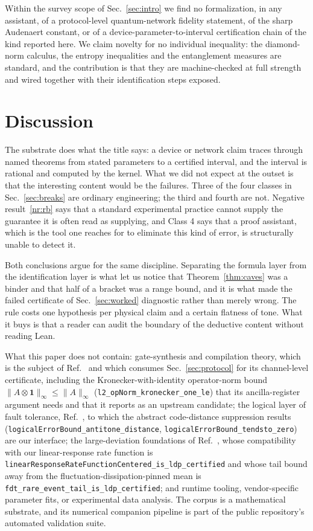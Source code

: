 \documentclass[aps,pra,reprint,nofootinbib,superscriptaddress]{revtex4-2}
\theoremstyle{plain}
\theoremstyle{definition}
\theoremstyle{remark}
\newcommand{\lean}[1]{\texttt{#1}}
\newcommand{\opnorm}[1]{\lVert #1 \rVert_{\infty}}
\begin{document}
Within the survey scope of Sec.~\ref{sec:intro} we find no formalization,
in any assistant, of a protocol-level quantum-network fidelity statement,
of the sharp Audenaert constant, or of a device-parameter-to-interval
certification chain of the kind reported here. We claim novelty for no
individual inequality: the diamond-norm calculus, the entropy
inequalities and the entanglement measures are standard, and the
contribution is that they are machine-checked at full strength and wired
together with their identification steps exposed.

\section{Discussion}
\label{sec:discussion}

The substrate does what the title says: a device or network claim traces
through named theorems from stated parameters to a certified interval,
and the interval is rational and computed by the kernel. What we did not
expect at the outset is that the interesting content would be the
failures. Three of the four classes in Sec.~\ref{sec:breaks} are ordinary
engineering; the third and fourth are not. Negative result~\ref{nr:rb}
says that a standard experimental practice cannot supply the guarantee it
is often read as supplying, and Class 4 says that a proof assistant,
which is the tool one reaches for to eliminate this kind of error, is
structurally unable to detect it.

Both conclusions argue for the same discipline. Separating the formula
layer from the identification layer is what let us notice that
Theorem~\ref{thm:caves} was a binder and that half of a bracket was a
range bound, and it is what made the failed certificate of
Sec.~\ref{sec:worked} diagnostic rather than merely wrong. The rule costs
one hypothesis per physical claim and a certain flatness of tone. What it
buys is that a reader can audit the boundary of the deductive content
without reading Lean.

What this paper does not contain: gate-synthesis and compilation theory,
which is the subject of Ref.~\cite{CompanionCompilation} and which
consumes Sec.~\ref{sec:protocol} for its channel-level certificate,
including the Kronecker-with-identity operator-norm bound
$\opnorm{A\otimes\mathbf 1} \le \opnorm{A}$
(\lean{l2\_opNorm\_kronecker\_one\_le}) that its ancilla-register
argument needs and that it reports as an upstream candidate; the logical
layer of fault tolerance, Ref.~\cite{CompanionFaultTolerance}, to which
the abstract code-distance suppression results
(\lean{logicalErrorBound\_antitone\_distance},
\lean{logicalErrorBound\_tendsto\_zero}) are our interface; the
large-deviation foundations of Ref.~\cite{CompanionStochastic}, whose
compatibility with our linear-response rate function is
\lean{linearResponseRateFunctionCentered\_is\_ldp\_certified} and whose
tail bound away from the fluctuation-dissipation-pinned mean is
\lean{fdt\_rare\_event\_tail\_is\_ldp\_certified}; and runtime tooling,
vendor-specific parameter fits, or experimental data analysis. The corpus
is a mathematical substrate, and its numerical companion pipeline is part
of the public repository's automated validation suite.
\end{document}
